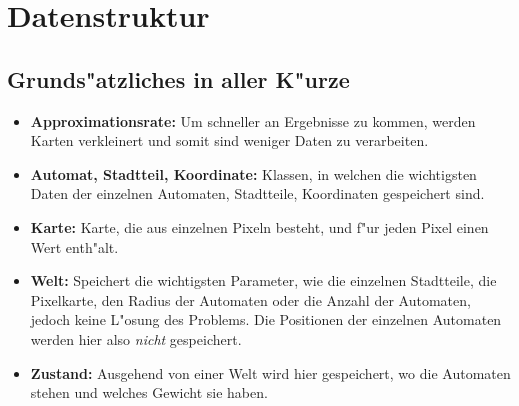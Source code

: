 \section{Datenstruktur}
\subsection{Grunds"atzliches in aller K"urze}
\begin{itemize}
\item \textbf{Approximationsrate:} Um schneller an Ergebnisse zu kommen, werden Karten verkleinert und somit sind weniger Daten zu verarbeiten.
\item \textbf{Automat, Stadtteil, Koordinate:} Klassen, in welchen die wichtigsten Daten der einzelnen Automaten, Stadtteile, Koordinaten gespeichert sind.
\item \textbf{Karte:} Karte, die aus einzelnen Pixeln besteht, und f"ur jeden Pixel einen Wert enth"alt.
\item \textbf{Welt:} Speichert die wichtigsten Parameter, wie die einzelnen Stadtteile, die Pixelkarte, den Radius der Automaten oder die Anzahl der Automaten, jedoch keine L"osung des Problems. Die Positionen der einzelnen Automaten werden hier also \emph{nicht} gespeichert.
\item \textbf{Zustand:} Ausgehend von einer Welt wird hier gespeichert, wo die Automaten stehen und welches Gewicht sie haben.
\end{itemize}








